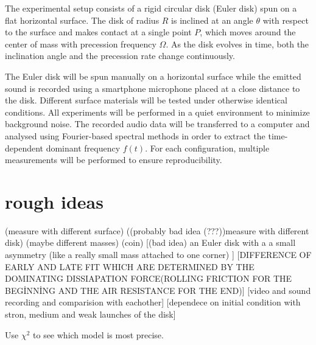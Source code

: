 \documentclass{article}
\begin{document}
The experimental setup consists of a rigid circular disk (Euler disk) spun on a flat horizontal surface. The disk of radius $R$ is inclined at an angle $\theta$ with respect to the surface and makes contact at a single point $P$, which moves around the center of mass with precession frequency $\Omega$. As the disk evolves in time, both the inclination angle and the precession rate change continuously.

The Euler disk will be spun manually on a horizontal surface while the emitted sound is recorded using a smartphone microphone placed at a close distance to the disk. Different surface materials  will be tested under otherwise identical conditions. All experiments will be performed in a quiet environment to minimize background noise. The recorded audio data will be transferred to a computer and analysed using Fourier-based spectral methods in order to extract the time-dependent dominant frequency $f(t)$. For each configuration, multiple measurements will be performed to ensure reproducibility.








\newpage
\section{rough ideas}
(measure with different surface)
((probably bad idea (???))measure with different disk)
(maybe different masses)
(coin)
[(bad idea) an Euler disk with a a small asymmetry (like a really small mass attached to one corner) ]
[DIFFERENCE OF EARLY AND LATE FIT WHICH ARE DETERMINED BY THE DOMINATING DISSIAPATION FORCE(ROLLING FRICTION FOR THE BEGİNNİNG AND THE AIR RESISTANCE FOR THE END)]
[video and sound recording and comparision with eachother]
[dependece on initial condition with stron, medium and weak launches of the disk]

Use $\chi^2$ to see which model is most precise.

\printbibliography
\end{document}
